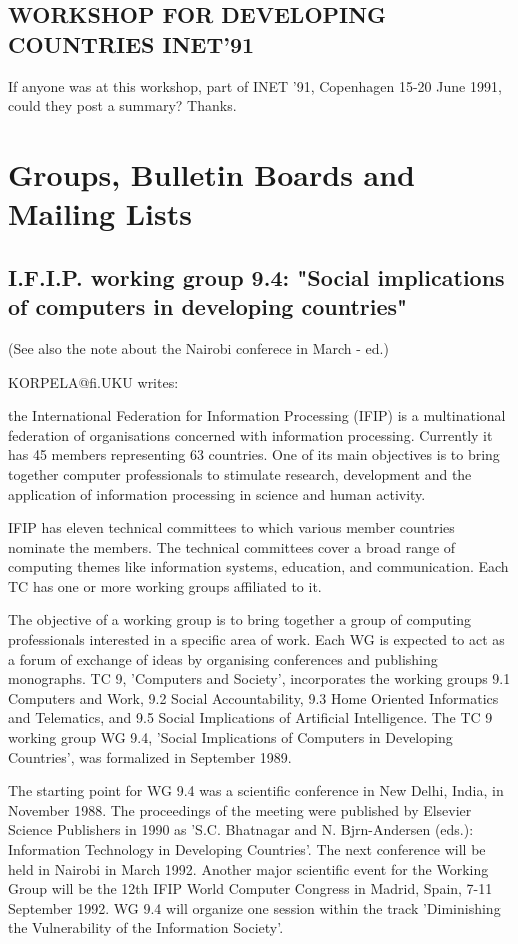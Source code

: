 \subsection{WORKSHOP FOR DEVELOPING COUNTRIES INET'91 }
If anyone was at this workshop, part of INET '91, Copenhagen 15-20
June 1991, could they post a summary? Thanks.

\section{Groups, Bulletin Boards and Mailing Lists}
\subsection{I.F.I.P.  working  group  9.4: 
"Social  implications  of  computers  in  developing  countries" }

(See also the note about the Nairobi conferece in March - ed.)

KORPELA@fi.UKU writes:

the International Federation for Information Processing (IFIP) is a
multinational federation of organisations concerned with
information processing.  Currently it has 45 members representing
63 countries.  One of its main objectives is to bring together
computer professionals to stimulate research, development and the
application of information processing in science and human
activity.
    
IFIP has eleven technical committees to which various member
countries nominate the members.  The technical committees cover
a broad range of computing themes like information systems,
education, and communication.  Each TC has one or more working
groups affiliated to it.

The objective of a working group is to bring together a group
of computing professionals interested in a specific area of work. 
Each WG is expected to act as a forum of exchange of ideas by
organising conferences and publishing monographs.
     TC 9, 'Computers and Society', incorporates the working
groups  9.1 Computers and Work,  9.2 Social Accountability, 
9.3 Home Oriented Informatics and Telematics,  and  9.5 Social
Implications of Artificial Intelligence.  The TC 9 working group
WG 9.4, 'Social Implications of Computers in Developing
Countries', was formalized in September 1989. 

The starting point for WG 9.4 was a scientific conference in
New Delhi, India, in November 1988.  The proceedings of the
meeting were published by Elsevier Science Publishers in 1990 as
'S.C. Bhatnagar and N. Bjrn-Andersen (eds.): Information
Technology in Developing Countries'.
    The next conference will be held in Nairobi in March 1992. 
Another major scientific event for the Working Group will be the
12th IFIP World Computer Congress in Madrid, Spain,
7-11 September 1992.  WG 9.4 will organize one session within the
track 'Diminishing the Vulnerability of the Information Society'.

